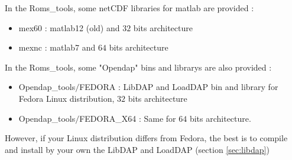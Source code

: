 In the Roms\_tools, some netCDF libraries for matlab are provided : 
\begin{itemize}
\item mex60 : matlab12 (old) and $32$ bits architecture
\item mexnc : matlab7 and $64$ bits architecture
\end{itemize}

In the Roms\_tools, some "Opendap" bins and librarys are also provided :
\begin{itemize}
\item Opendap\_tools$/$FEDORA : LibDAP and LoadDAP bin and library for Fedora Linux
  distribution, $32$ bits architecture
\item Opendap\_tools$/$FEDORA\_X64 : Same for $64$ bits architecture.
\end{itemize}
However, if your Linux distribution differs from Fedora, the best is to compile and
install by your own the LibDAP and LoadDAP (section \ref{sec:libdap}) \\


